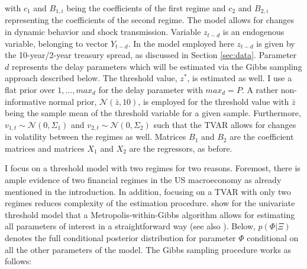 \documentclass[12pt,letterpaper,fleqn]{article}           %
\begin{document}
with $c_1$ and $B_{1,i}$ being the coefficients of the first regime and $c_2$ and $B_{2,i}$ representing the coefficients of the second regime. The model allows for changes in dynamic behavior and shock transmission. Variable $z_{t-d}$ is an endogenous variable, belonging to vector $Y_{t-d}$. In the model employed here $z_{t-d}$ is given by the 10-year/2-year treasury spread, as discussed in Section \ref{sec:data}. Parameter $d$ represents the delay parameters which will be estimated via the Gibbs sampling approach described below. The threshold value, $z^*$, is estimated as well. I use a flat prior over $1,\ldots,max_d$ for the delay parameter with $max_d = P$. A rather non-informative normal prior, $\mathcal{N}(\bar{z}, 10)$, is employed for the threshold value with $\bar{z}$ being the sample mean of the threshold variable for a given sample. Furthermore, $v_{1,t} \sim \mathcal{N}(0, \Sigma_1)$ and $v_{2,t} \sim \mathcal{N}(0, \Sigma_2)$ such that the TVAR allows for changes in volatility between the regimes as well. Matrices $B_1$ and $B_2$ are the coefficient matrices and matrices $X_1$ and $X_2$ are the regressors, as before.  

I focus on a threshold model with two regimes for two reasons. Foremost, there is ample evidence of two financial regimes in the US macroeconomy as already mentioned in the introduction. In addition, focusing on a TVAR with only two regimes reduces complexity of the estimation procedure. \textcite{chen95} show for the univariate threshold model that a Metropolis-within-Gibbs algorithm allows for estimating all parameters of interest in a straightforward way (see also \cite{alessandri17}). Below, $p(\Phi|\Xi)$ denotes the full conditional posterior distribution for parameter $\Phi$ conditional on all the other parameters of the model. The Gibbs sampling procedure works as follows:
\end{document}

